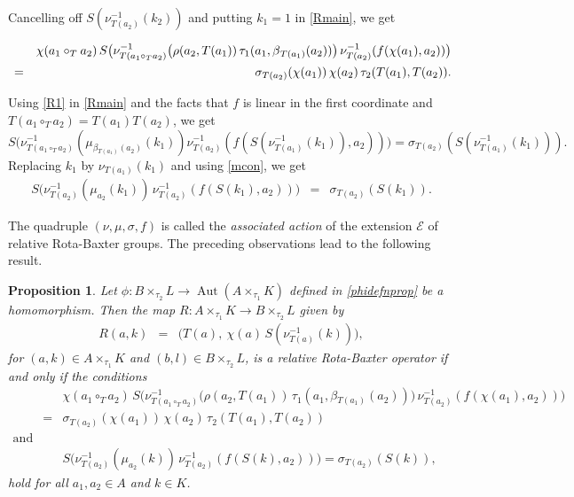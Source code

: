 \documentclass[11pt]{amsart}
\theoremstyle{thrm}
\theoremstyle{plain}
\newtheorem{prop}[thm]{Proposition}
\theoremstyle{definition}
\newcommand{\Aut}{\operatorname{Aut} }
\numberwithin{equation}{section}
\begin{document}
Cancelling off $S(\nu^{-1}_{T(a_2)}(k_2))$ and putting $k_1 = 1$ in \eqref{Rmain}, we get 
\begin{small}
\begin{eqnarray}\label{R1}
&& \chi(a_1 \circ_{T} a_2) \,S \big(\nu^{-1}_{T(a_1 \circ_{T} a_2)}\big(\rho(a_2, T(a_1)) \,\tau_1(a_1,\beta{_{T(a_1)}}(a_2))\big) \,\nu^{-1}_{T(a_2)}(f(\chi(a_1), a_2))\big) \\
&= &  \sigma_{T(a_2)}( \chi(a_1)) \, \chi(a_2) \,\tau_2(T(a_1), T(a_2) ). \notag
\end{eqnarray}
\end{small}
Using \eqref{R1} in \eqref{Rmain} and the facts that $f$ is linear in the first coordinate and  $T(a_1 \circ_{T} a_2)=  T(a_1)T(a_2)$, we get
\begin{equation}
S\big(\nu^{-1}_{T(a_1 \circ_{T} a_2)}(\mu_{\beta{_{T(a_1)}}(a_2)}(k_1))\nu^{-1}_{T(a_2)}(f(S(\nu^{-1}_{T(a_1)}(k_1)), a_2))\big)= \sigma_{T(a_2)}(S(\nu^{-1}_{T(a_1)}(k_1))).
\end{equation}
Replacing $k_1$ by $\nu_{T(a_1)}(k_1)$ and using \eqref{mcon}, we get
\begin{eqnarray}\label{finalactrel}
	S\big(\nu^{-1}_{T(a_2)}(\mu_{a_2}(k_1)) \,\nu^{-1}_{T( a_2)}(f(S(k_1), a_2))\big) &=& \sigma_{T(a_2)}(S(k_1)).
\end{eqnarray}

The quadruple $(\nu, \mu, \sigma, f)$ is called the \emph{associated action} of the extension $\mathcal{E}$ of relative Rota-Baxter groups. The preceding observations lead to the following result.

\begin{prop}\label{Rallcondn}
Let $\phi: B \times_{\tau_2} L \longrightarrow \Aut(A \times_{\tau_1} K )$ defined in \eqref{phidefnprop} be a homomorphism. Then the map  $R:  A \times_{\tau_1} K \rightarrow B \times_{\tau_2} L$ given by
\begin{eqnarray*}
R(a,k) &= & \big(T(a), ~\chi(a) \,S(\nu^{-1}_{T(a)}(k))\big),
\end{eqnarray*} 
for $(a,k) \in A \times_{\tau_1} K$ and $(b,l) \in B \times_{\tau_2} L$, is a relative Rota-Baxter operator if and only if the conditions 
\begin{eqnarray*}
& & \chi(a_1 \circ_{T} a_2) \,S \big(\nu^{-1}_{T(a_1 \circ_{T} a_2)}\big(\rho(a_2, T(a_1)) \,\tau_1(a_1,\beta{_{T(a_1)}}(a_2))\big) \,\nu^{-1}_{T(a_2)}(f(\chi(a_1), a_2))\big) \\
& =&   \sigma_{T(a_2)}( \chi(a_1)) \, \chi(a_2) \,\tau_2(T(a_1), T(a_2) )\\
\textrm{and} &&\\
&& S\big(\nu^{-1}_{T(a_2)}(\mu_{a_2}(k)) \,\nu^{-1}_{T( a_2)}(f(S(k), a_2))\big) = \sigma_{T(a_2)}(S(k)),	
\end{eqnarray*}		
hold for all $ a_1, a_2 \in A$ and $ k \in K$.
\end{prop}
\end{document}

